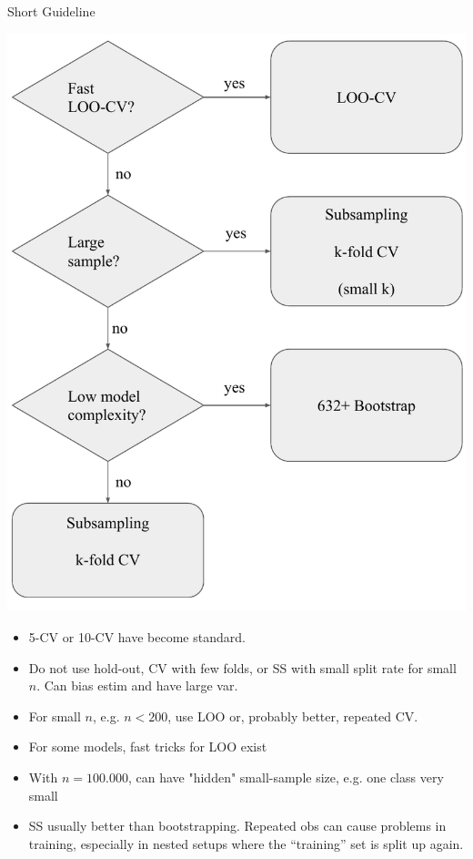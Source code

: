 \begin{vbframe}{Short Guideline}

\fboxsep=0pt
\noindent%
\begin{minipage}[t]{0.42\linewidth}
\vspace{0pt}
\includegraphics{figure_man/resampling_dec_tree}
\end{minipage}%
\hfill%
%
\begin{minipage}[t]{0.58\linewidth}
\vspace{0pt}
\footnotesize
\begin{itemize}
  \item 5-CV or 10-CV have become standard.
  \item Do not use hold-out, CV with few folds, or SS with small 
  split rate for small $n$. Can bias estim and have large var.
  \item For small $n$, e.g. $n < 200$, use 
  LOO or, probably better, repeated CV.
  \item For some models, fast tricks for LOO exist
  \item With $n = 100.000$, can have "hidden" small-sample size, e.g.
  one class very small
  \item SS usually better than bootstrapping. Repeated obs can cause problems in training,
    especially in nested setups where the \enquote{training} set is split up again.
\end{itemize}
\end{minipage}



\end{vbframe}

\endlecture

